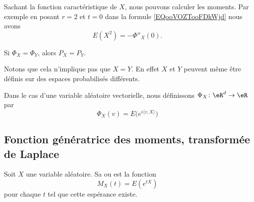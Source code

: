 \begin{example}
	Sachant la fonction caractéristique de \( X\), nous pouvons calculer les moments. Par exemple en posant \( r=2\) et \( t=0\) dans la formule \eqref{EQooVOZTooFDkWjd} nous avons
	\begin{equation}
		E(X^2)=-\Phi''_X(0).
	\end{equation}
\end{example}

\begin{theorem}     \label{ThonMxtTy}
	Si \( \Phi_X=\Phi_Y\), alors \( P_X=P_Y\).
\end{theorem}
Notons que cela n'implique pas que \( X=Y\). En effet \( X\) et \( Y\) peuvent même être définis sur des espaces probabilisés différents.

Dans le cas d'une variable aléatoire vectorielle, nous définissons \( \Phi_X\colon \eR^d\to \eR\) par
\begin{equation}        \label{EqydvDxg}
	\Phi_X(v)=E\big(  e^{i\langle v, X\rangle } \big)
\end{equation}

\subsection{Fonction génératrice des moments, transformée de Laplace}

Soit \( X\) une variable aléatoire. Sa  ou  est la fonction
\begin{equation}
	M_X(t)=E( e^{tX})
\end{equation}
pour chaque \( t\) tel que cette espérance existe.

